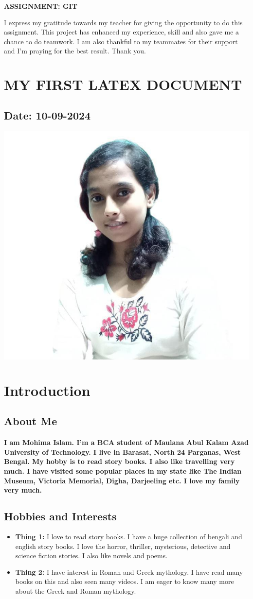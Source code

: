 \documentclass[12pt]{article}
\begin{document}
\begin{center}
\Huge \textbf{ASSIGNMENT: GIT}
\end{center}

I express my gratitude towards my teacher for giving the opportunity to do this assignment. This project has enhanced my experience, skill and also gave me a chance to do teamwork. I am also thankful to my teammates for their support and I'm praying for the best result. Thank you.
\newpage
\section{MY FIRST LATEX DOCUMENT}
\subsection*{Date: 10-09-2024}
 \begin{center}
        \includegraphics[width=0.5\linewidth]{mohima.jpg}
     \end{center}
\section{Introduction}
\subsection{About Me}
\paragraph{I am Mohima Islam. I'm a BCA student of Maulana Abul Kalam Azad University of Technology. I live in Barasat, North 24 Parganas, West Bengal. My hobby is to read story books. I also like travelling very much. I have visited some popular places in my state like The Indian Museum, Victoria Memorial, Digha, Darjeeling etc. I love my family very much. }
\subsection{Hobbies and Interests}
\begin{itemize}
    \item \textbf{Thing 1: }I love to read story books. I have a huge collection of bengali and english story books. I love the horror, thriller, mysterious, detective and science fiction stories. I also like novels and poems.
    \item \textbf{Thing 2: }I have interest in Roman and Greek mythology. I have read many books on this and also seen many videos. I am eager to know many more about the Greek and Roman mythology. 
\end{itemize}
\end{document}
